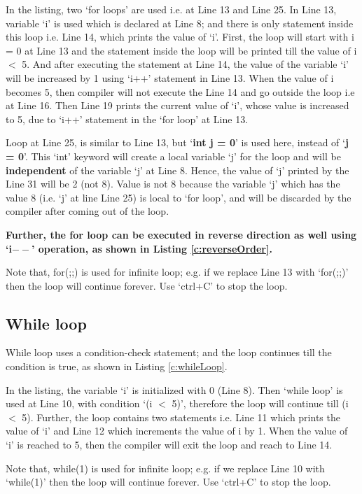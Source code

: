 \begin{explanation}
	In the listing, two `for loops' are used i.e. at Line 13 and Line 25. In Line 13, variable `i' is used which is declared at Line 8; and there is only statement inside this loop i.e. Line 14, which prints the value of `i'. First, the loop will start with i = 0 at Line 13 and the statement inside the loop will be printed till the value of i $<$ 5. And after executing the statement at Line 14, the value of the variable `i' will be increased by 1 using `i++' statement in Line 13. When the value of i becomes 5, then compiler will not execute the Line 14 and go outside the loop i.e at Line 16. Then Line 19 prints the current value of `i', whose value is increased to 5, due to `i++' statement in the `for loop' at Line 13.
	
	Loop at Line 25, is similar to Line 13, but `\textbf{int j = 0}' is used here, instead of `\textbf{j = 0}'. This `int' keyword will create a local variable `j' for the loop and will be \textbf{independent} of the variable `j' at Line 8. Hence, the value of `j' printed by the Line 31 will be 2 (not 8). Value is not 8 because the variable `j' which has the value 8 (i.e. `j' at line Line 25) is local to `for loop', and will be discarded by the compiler after coming out of the loop. 

	\textbf{Further, the for loop can be executed in reverse direction as well using `i$--$' operation, as shown in Listing \ref{c:reverseOrder}.}	
\end{explanation}

\begin{noNumBox}
	Note that, for(;;) is used for infinite loop; e.g. if we replace Line 13 with `for(;;)'
	then the loop will continue forever. Use `ctrl+C' to stop the loop.
\end{noNumBox}
	


\subsection{While loop}
While loop uses a condition-check statement; and the loop continues till the condition is true, as shown in Listing \ref{c:whileLoop}.

\begin{explanation}
	In the listing, the variable `i' is initialized with 0 (Line 8). Then `while loop' is used at Line 10, with condition `(i $<$ 5)', therefore the loop will continue till (i $<$ 5). Further, the loop contains two statements i.e. Line 11 which prints the value of `i' and Line 12 which increments the value of i by 1. When the value of `i' is reached to 5, then the compiler will exit the loop and reach to Line 14. 
	
	\begin{noNumBox}
		Note that, while(1) is used for infinite loop; e.g. if we replace Line 10 with `while(1)'
		then the loop will continue forever. Use `ctrl+C' to stop the loop.
	\end{noNumBox}
\end{explanation}

